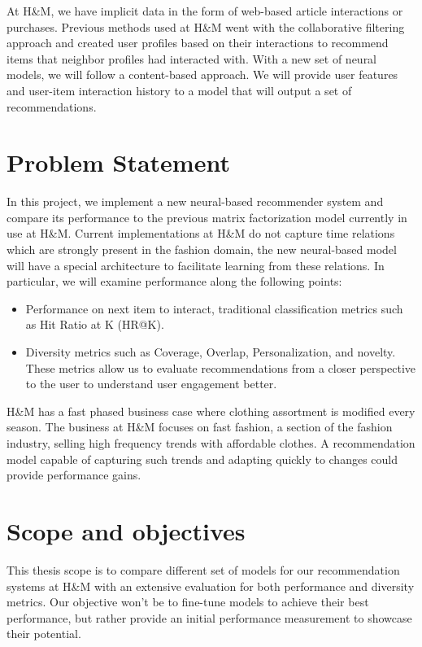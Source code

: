 \documentclass{tex_files/kththesis}
\begin{document}
At H\&M, we have implicit data in the form of web-based article interactions or purchases. Previous methods used at H\&M went with the collaborative filtering approach and created user profiles based on their interactions to recommend items that neighbor profiles had interacted with. With a new set of neural models, we will follow a content-based approach. We will provide user features and user-item interaction history to a model that will output a set of recommendations.

\section{Problem Statement}

In this project, we implement a new neural-based recommender system and compare its performance to the previous matrix factorization model currently in use at H\&M.  Current implementations at H\&M do not capture time relations which are strongly present in the fashion domain, the new neural-based model will have a special architecture to facilitate learning from these relations. In particular, we will examine performance along the following points:

\begin{itemize}
    \item Performance on next item to interact, traditional classification metrics such as Hit Ratio at K (HR@K).
    \item Diversity metrics such as Coverage, Overlap, Personalization, and novelty. These metrics allow us to evaluate recommendations from a closer perspective to the user to understand user engagement better. 
\end{itemize}

H\&M has a fast phased business case where clothing assortment is modified every season. The business at H\&M focuses on fast fashion, a section of the fashion industry, selling high frequency trends with affordable clothes. A recommendation model capable of capturing such trends and adapting quickly to changes could provide performance gains.

\section{Scope and objectives}
This thesis scope is to compare different set of models for our recommendation systems at H\&M with an extensive evaluation for both performance and diversity metrics. Our objective won't be to fine-tune models to achieve their best performance, but rather provide an initial performance measurement to showcase their potential.
\end{document}
